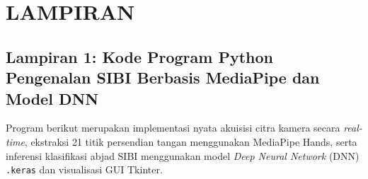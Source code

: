 \chapter*{LAMPIRAN}
\renewcommand{\thefigure}{6.\arabic{figure}}
\setcounter{figure}{0}

\section*{Lampiran 1: Kode Program Python Pengenalan SIBI Berbasis MediaPipe dan Model DNN}

Program berikut merupakan implementasi nyata akuisisi citra kamera secara \textit{real-time}, ekstraksi 21 titik persendian tangan menggunakan MediaPipe Hands, serta inferensi klasifikasi abjad SIBI menggunakan model \textit{Deep Neural Network} (DNN) \texttt{.keras} dan visualisasi GUI Tkinter.

